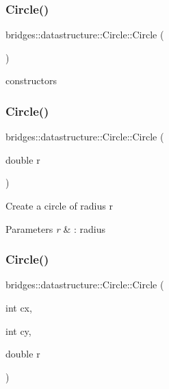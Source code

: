 \subsubsection{\texorpdfstring{Circle()}{Circle()}\hspace{0.1cm}{\footnotesize\ttfamily [1/3]}}
{\footnotesize\ttfamily bridges\+::datastructure\+::\+Circle\+::\+Circle (\begin{DoxyParamCaption}{ }\end{DoxyParamCaption})\hspace{0.3cm}{\ttfamily [inline]}}

constructors \mbox{\label{classbridges_1_1datastructure_1_1_circle_a9b814f207d8753ce943b667088963612}} 
\subsubsection{\texorpdfstring{Circle()}{Circle()}\hspace{0.1cm}{\footnotesize\ttfamily [2/3]}}
{\footnotesize\ttfamily bridges\+::datastructure\+::\+Circle\+::\+Circle (\begin{DoxyParamCaption}\item[{double}]{r }\end{DoxyParamCaption})\hspace{0.3cm}{\ttfamily [inline]}}

Create a circle of radius r 
\begin{DoxyParams}{Parameters}
{\em r} & \+: radius \\
\hline
\end{DoxyParams}
\mbox{\label{classbridges_1_1datastructure_1_1_circle_acb70c092269aa77bbf1afdbdd56234fe}} 
\subsubsection{\texorpdfstring{Circle()}{Circle()}\hspace{0.1cm}{\footnotesize\ttfamily [3/3]}}
{\footnotesize\ttfamily bridges\+::datastructure\+::\+Circle\+::\+Circle (\begin{DoxyParamCaption}\item[{int}]{cx,  }\item[{int}]{cy,  }\item[{double}]{r }\end{DoxyParamCaption})\hspace{0.3cm}{\ttfamily [inline]}}

